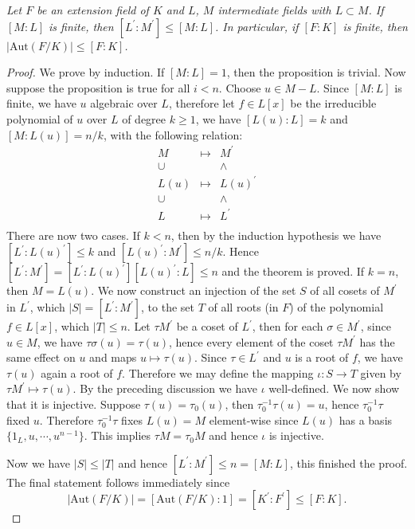 \begin{lemma}\em
Let $F$ be an extension field of $K$ and $L$, $M$ intermediate fields with $L\subset M$. If $[M:L]$ is finite, then $[L^\prime:M^\prime]\le[M:L]$. In particular, if $[F:K]$ is finite, then $|\mathrm{Aut}(F/K)|\le [F:K]$.
\end{lemma}
\begin{proof}
We prove by induction. If $[M:L]=1$, then the proposition is trivial. Now suppose the proposition is true for all $i<n$. Choose $u\in M-L$. Since $[M:L]$ is finite, we have $u$ algebraic over $L$, therefore let $f\in L[x]$ be the irreducible polynomial of $u$ over $L$ of degree $k\ge 1$, we have $[L(u):L]=k$ and $[M:L(u)]=n/k$, with the following relation: 
$$
\begin{matrix}
	M&		\mapsto&		M^{\prime}\\
	\cup&		&		\land\\
	L\left( u \right)&		\mapsto&		L\left( u \right) ^{\prime}\\
	\cup&		&		\land\\
	L&		\mapsto&		L^{\prime}\\
\end{matrix}
$$
There are now two cases. If $k<n$, then by the induction hypothesis we have $[L^\prime:L(u)^\prime]\le k$ and $[L(u)^\prime:M^\prime]\le n/k$. Hence $[L^\prime:M^\prime]=[L^\prime:L(u)^\prime][L(u)^\prime:L]\le n$ and the theorem is proved. If $k=n$, then $M=L(u)$. We now construct an injection of the set $S$ of all cosets of $M^\prime$ in $L^\prime$, which $|S|=[L^\prime:M^\prime]$, to the set $T$ of all roots (in $F$) of the polynomial $f\in L[x]$, which $|T|\le n$. Let $\tau M^\prime$ be a coset of $L^\prime$, then for each $\sigma\in M^\prime$, since $u\in M$, we have $\tau\sigma(u)=\tau(u)$, hence every element of the coset $\tau M^\prime$ has the same effect on $u$ and maps $u\mapsto\tau(u)$. Since $\tau\in L^\prime$ and $u$ is a root of $f$, we have $\tau(u)$ again a root of $f$. Therefore we may define the mapping $\iota: S\to T$ given by $\tau M^\prime\mapsto\tau(u)$. By the preceding discussion we have $\iota$ well-defined. We now show that it is injective. Suppose $\tau(u)=\tau_0(u)$, then $\tau_0^{-1}\tau(u)=u$, hence $\tau_0^{-1}\tau$ fixed $u$. Therefore $\tau_0^{-1}\tau$ fixes $L(u)=M$ element-wise since $L(u)$ has a basis $\{1_L,u,\cdots,u^{n-1}\}$. This implies $\tau M=\tau_0M$ and hence $\iota$ is injective.\par
Now we have $|S|\le |T|$ and hence $[L^\prime:M^\prime]\le n=[M:L]$, this finished the proof. The final statement follows immediately since 
$$|\mathrm{Aut}(F/K)|=[\mathrm{Aut}(F/K):1]=[K^\prime:F^\prime]\le[F:K].$$
\end{proof}

